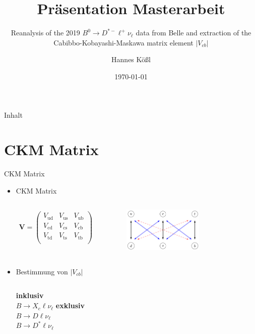 \documentclass{beamer}
\title{Präsentation Masterarbeit}
\subtitle{Reanalysis of the 2019 $B^0 \longrightarrow  D^{*-}\ell^+ \nu_{\ell}$ data from Belle and extraction of the Cabibbo-Kobayashi-Maskawa matrix element $|V_{cb}|$}
\author{Hannes Kößl}
\institute[TU Wien]{Institut für Hochenergiephysik (HEPHY, Wien)}
\date{\today}
\begin{document}
\begin{frame}
    \titlepage 
\end{frame}

\logo{}


\begin{frame}{Inhalt}
    \tableofcontents
\end{frame}

\section{CKM Matrix}
\begin{frame}{CKM Matrix}
\begin{itemize}
    \item CKM Matrix

\begin{columns}
\Large
\begin{align*}
\textbf{V}=
\left(
\begin{array}{ccc}
 V_{\text{ud}} & V_{\text{us}} & V_{\text{ub}} \\
 V_{\text{cd}} & V_{\text{cs}} & V_{\text{cb}} \\
 V_{\text{td}} & V_{\text{ts}} & V_{\text{tb}} \\
\end{array}
\right)
\end{align*}
\normalsize
{}
\begin{figure}[htbp]
   \centering
    \includegraphics[width=0.65\textwidth]{./Bilder/CKM6}
   
    \label{fig:ink_exk}
\end{figure}  
\end{columns}
\vspace{0.5cm}
\item Bestimmung von $|V_{cb}|$
\begin{columns}
\centering \textbf{inklusiv}\\
$B\rightarrow X_c \ell \nu_{\ell}$
\centering \textbf{exklusiv}\\
$B\rightarrow D \ell \nu_{\ell}$\\
$B\rightarrow D^* \ell \nu_{\ell}$

\end{columns}
\end{itemize}
\end{frame}
\end{document}

